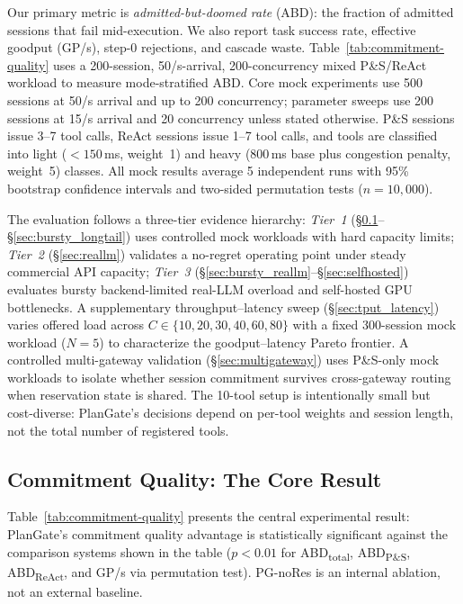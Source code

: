 \documentclass[sigconf,review,anonymous]{acmart}
\begin{document}
Our primary metric is \emph{admitted-but-doomed rate} (ABD): the fraction of admitted sessions that fail mid-execution. We also report task success rate, effective goodput (GP/s), step-0 rejections, and cascade waste. Table~\ref{tab:commitment-quality} uses a 200-session, 50/s-arrival, 200-concurrency mixed P\&S/ReAct workload to measure mode-stratified ABD. Core mock experiments use 500 sessions at 50/s arrival and up to 200 concurrency; parameter sweeps use 200 sessions at 15/s arrival and 20 concurrency unless stated otherwise. P\&S sessions issue 3--7 tool calls, ReAct sessions issue 1--7 tool calls, and tools are classified into light ($<150$\,ms, weight~1) and heavy (800\,ms base plus congestion penalty, weight~5) classes. All mock results average 5 independent runs with 95\% bootstrap confidence intervals and two-sided permutation tests ($n{=}10{,}000$).

The evaluation follows a three-tier evidence hierarchy: \emph{Tier~1} (\S\ref{sec:commitment_quality}--\S\ref{sec:bursty_longtail}) uses controlled mock workloads with hard capacity limits; \emph{Tier~2} (\S\ref{sec:reallm}) validates a no-regret operating point under steady commercial API capacity; \emph{Tier~3} (\S\ref{sec:bursty_reallm}--\S\ref{sec:selfhosted}) evaluates bursty backend-limited real-LLM overload and self-hosted GPU bottlenecks. A supplementary throughput--latency sweep (\S\ref{sec:tput_latency}) varies offered load across $C{\in}\{10,20,30,40,60,80\}$ with a fixed 300-session mock workload ($N{=}5$) to characterize the goodput--latency Pareto frontier. A controlled multi-gateway validation (\S\ref{sec:multigateway}) uses P\&S-only mock workloads to isolate whether session commitment survives cross-gateway routing when reservation state is shared. The 10-tool setup is intentionally small but cost-diverse: PlanGate's decisions depend on per-tool weights and session length, not the total number of registered tools.

\subsection{Commitment Quality: The Core Result}
\label{sec:commitment_quality}



Table~\ref{tab:commitment-quality} presents the central experimental result: PlanGate's commitment quality advantage is statistically significant against the comparison systems shown in the table ($p < 0.01$ for ABD\textsubscript{total}, ABD\textsubscript{P\&S}, ABD\textsubscript{ReAct}, and GP/s via permutation test). PG-noRes is an internal ablation, not an external baseline.
\end{document}
